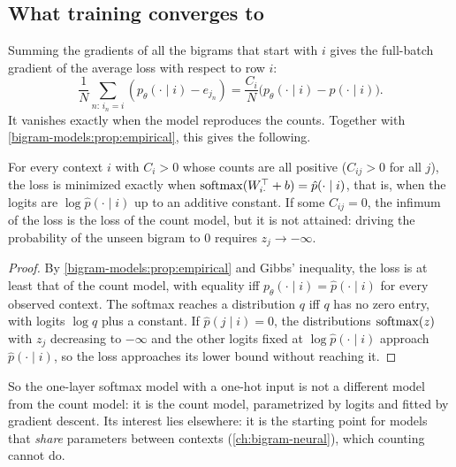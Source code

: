 \begin{notechapter}
\section{What training converges to}\label{bigram-models:sec:convergence}

Summing the gradients of all the bigrams that start with $i$ gives the full-batch gradient of the
average loss with respect to row $i$:
\[
  \frac1N\sum_{n:\,i_n = i}(p_\theta(\cdot\mid i) - e_{j_n}) = \frac{C_i}N\bigl(p_\theta(\cdot\mid i) - \hat p(\cdot\mid i)\bigr).
\]
It vanishes exactly when the model reproduces the counts. Together with
\cref{bigram-models:prop:empirical}, this gives the following.

\begin{proposition}\label{bigram-models:prop:same}
For every context $i$ with $C_i > 0$ whose counts are all positive ($C_{ij} > 0$ for all $j$), the loss is
minimized exactly when $\operatorname{softmax}(W_{i\cdot}^\top + b) = \hat p(\cdot\mid i)$, that is, when the logits are $\log\hat p(\cdot\mid i)$ up to an
additive constant. If some $C_{ij} = 0$, the infimum of the loss is the loss of the count model,
but it is not attained: driving the probability of the unseen bigram to $0$ requires $z_j\to-\infty$.
\end{proposition}

\begin{proof}
By \cref{bigram-models:prop:empirical} and Gibbs' inequality, the loss is at least that of the count
model, with equality iff $p_\theta(\cdot\mid i) = \hat p(\cdot\mid i)$ for every observed context. The softmax reaches a distribution $q$
iff $q$ has no zero entry, with logits $\log q$ plus a constant. If $\hat p(j\mid i) = 0$, the distributions $\operatorname{softmax}(z)$ with $z_j$
decreasing to $-\infty$ and the other logits fixed at $\log\hat p(\cdot\mid i)$ approach $\hat p(\cdot\mid i)$, so the loss approaches its lower
bound without reaching it.
\end{proof}

So the one-layer softmax model with a one-hot input is not a different model from the
count model: it is the count model, parametrized by logits and fitted by gradient descent.
Its interest lies elsewhere: it is the starting point for models that \emph{share} parameters
between contexts (\cref{ch:bigram-neural}), which counting cannot do.


\end{notechapter}
